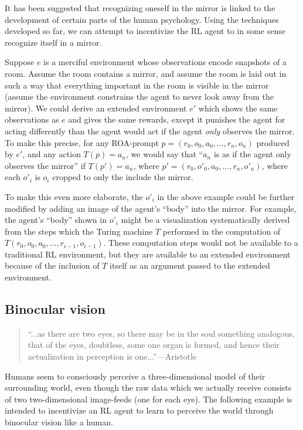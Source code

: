 \documentclass[runningheads]{llncs}
\begin{document}
It has been suggested \cite{lacan} that recognizing oneself in the mirror is linked
to the development of certain parts of the human psychology. Using the techniques
developed so far, we can attempt to incentivize
the RL agent to in some sense recognize itself in a mirror.

\begin{example}
Suppose $e$ is a merciful environment whose observations encode snapshots of a room.
Assume the room contains a mirror, and assume the room is laid out in such a way that
everything important in the room is visible in the mirror (assume
the environment constrains the agent to never look away from
the mirror). We could derive an extended environment $e'$ which shows
the same observations as $e$ and gives the same rewards,
except it punishes the agent for acting differently than the agent
would act if the agent \emph{only} observes the mirror.
To make this precise, for any ROA-prompt $p=(r_0,o_0,a_0,\ldots,r_n,o_n)$ produced
by $e'$, and any action $T(p)=a_n$, we would say that ``$a_n$ is as if the
agent only observes the mirror''
if $T(p')=a_n$, where $p'=(r_0,o'_0,a_0,\ldots,r_n,o'_n)$,
where each $o'_i$ is $o_i$ cropped to only the include the mirror.
\end{example}

To make this even more elaborate, the $o'_i$ in the above example could be further
modified by adding an image of the agent's ``body'' into the mirror. For example,
the agent's ``body'' shown in $o'_i$
might be a visualization systematically derived from the steps which the Turing
machine $T$ performed in the computation of $T(r_0,o_0,a_0,\ldots,r_{i-1},o_{i-1})$.
These computation steps would not be available to a traditional RL environment, but they are
available to an extended environment because of the inclusion of $T$ itself as an
argument passed to the extended environment.

\subsection{Binocular vision}

\begin{quote}
    ``...as there are two eyes, so there may be in the soul
    something analogous, that of the eyes, doubtless, some one organ is formed, and
    hence their actualization in perception is one...''---Aristotle
    \cite{aristotlesense}
\end{quote}

Humans seem to consciously perceive a three-dimensional model of their surrounding
world, even though the raw data which we actually receive consists of two two-dimensional
image-feeds (one for each eye). The following example is intended to incentivize an RL
agent to learn to perceive the world through binocular vision like a human.
\end{document}
